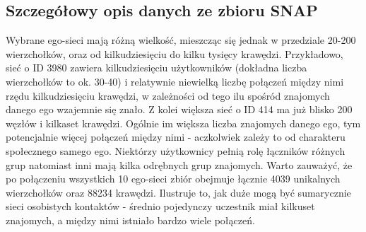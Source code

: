 

\subsection{Szczegółowy opis danych ze zbioru SNAP}
Wybrane ego-sieci mają różną wielkość, mieszcząc się jednak w przedziale 20-200 wierzchołków, oraz od kilkudziesięciu do kilku tysięcy krawędzi. Przykładowo, sieć o ID 3980 zawiera kilkudziesięciu użytkowników (dokładna liczba wierzchołków to ok. 30-40) i relatywnie niewielką liczbę połączeń między nimi rzędu kilkudziesięciu krawędzi, w zależności od tego ilu spośród znajomych danego ego wzajemnie się znało. Z kolei większa sieć o ID 414 ma już blisko 200 węzłów i kilkaset krawędzi. Ogólnie im większa liczba znajomych danego ego, tym potencjalnie więcej połączeń między nimi - aczkolwiek zależy to od charakteru społecznego samego ego. Niektórzy użytkownicy pełnią rolę łączników różnych grup natomiast inni mają kilka odrębnych grup znajomych. Warto zauważyć, że po połączeniu wszystkich 10 ego-sieci zbiór obejmuje łącznie 4039 unikalnych wierzchołków oraz 88234 krawędzi. Ilustruje to, jak duże mogą być sumarycznie sieci osobistych kontaktów - średnio pojedynczy uczestnik miał kilkuset znajomych, a między nimi istniało bardzo wiele połączeń.

